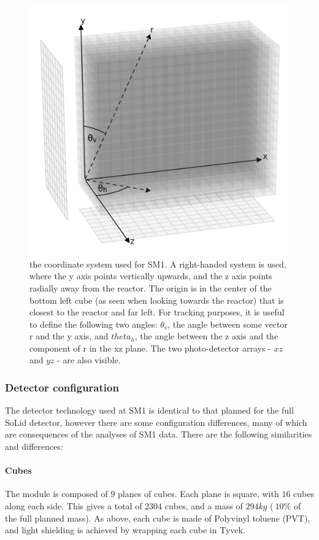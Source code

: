 {\begin{figure}
\begin{center}
\includegraphics[width=0.8\columnwidth]{Chapters/solid1/codnSystem.png}
\caption{the coordinate system used for SM1. A right-handed system is used, where the y axis points vertically upwards, and the z axis points radially away from the reactor. The origin is in the center of the bottom left cube (as seen when looking towards the reactor) that is closest to the reactor and far left. For tracking purposes, it is useful to define the following two angles: $\theta_v$, the angle between some vector r and the y axis, and $theta_h$, the angle between the z axis and the component of r in the xz plane. The two photo-detector arrays - $xz$ and $yz$ - are also visible.}
\label{fig:sm1_codn_system}
\end{center}
\end{figure}

\subsubsection{Detector configuration}
The detector technology used at SM1 is identical to that planned for the full SoLid detector, however there are some configuration differences, many of which are consequences of the analyses of SM1 data. There are the following similarities and differences:

\paragraph{Cubes}
The module is composed of $9$ planes of cubes. Each plane is square, with $16$ cubes along each side. This gives a total of $2304$ cubes, and a mass of $294kg$ ($~10\%$ of the full planned mass). As above, each cube is made of Polyvinyl toluene (PVT), and light shielding is achieved by wrapping each cube in Tyvek.

}
